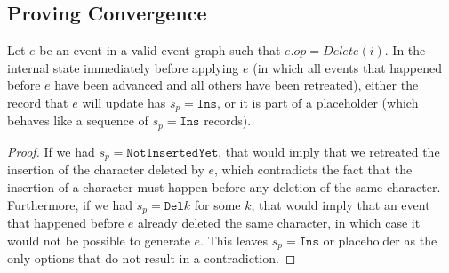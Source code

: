 \documentclass[sigplan,10pt]{acmart}
\begin{document}
\subsection{Proving Convergence}

\begin{lemma}\label{lemma-prepare-delete}
  Let $e$ be an event in a valid event graph such that $e.\mathit{op} = \mathit{Delete}(i)$.
  In the internal state immediately before applying $e$ (in which all events that happened before $e$ have been advanced and all others have been retreated), either the record that $e$ will update has $s_p = \texttt{Ins}$, or it is part of a placeholder (which behaves like a sequence of $s_p = \texttt{Ins}$ records).
\end{lemma}
\begin{proof}
  If we had $s_p = \texttt{NotInsertedYet}$, that would imply that we retreated the insertion of the character deleted by $e$, which contradicts the fact that the insertion of a character must happen before any deletion of the same character.
  Furthermore, if we had $s_p = \texttt{Del} k$ for some $k$, that would imply that an event that happened before $e$ already deleted the same character, in which case it would not be possible to generate $e$.
  This leaves $s_p = \texttt{Ins}$ or placeholder as the only options that do not result in a contradiction.
\end{proof}
\end{document}
